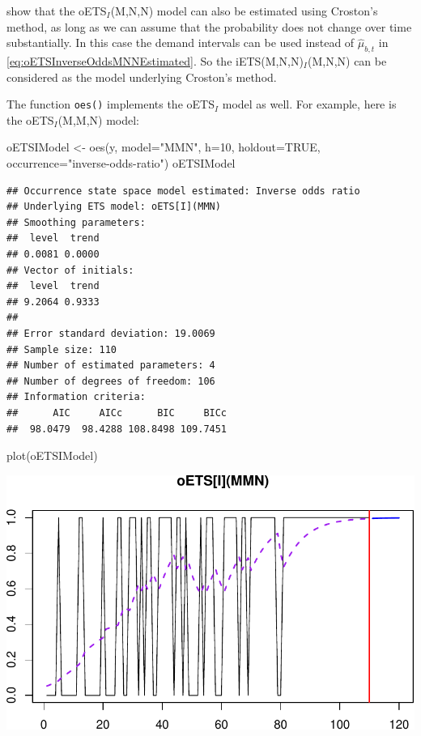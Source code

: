 \documentclass[
]{book}
\newenvironment{Shaded}{\begin{snugshade}}{\end{snugshade}}
\newcommand{\AttributeTok}[1]{\textcolor[rgb]{0.77,0.63,0.00}{#1}}
\newcommand{\ConstantTok}[1]{\textcolor[rgb]{0.00,0.00,0.00}{#1}}
\newcommand{\DecValTok}[1]{\textcolor[rgb]{0.00,0.00,0.81}{#1}}
\newcommand{\FunctionTok}[1]{\textcolor[rgb]{0.00,0.00,0.00}{#1}}
\newcommand{\NormalTok}[1]{#1}
\newcommand{\OtherTok}[1]{\textcolor[rgb]{0.56,0.35,0.01}{#1}}
\newcommand{\StringTok}[1]{\textcolor[rgb]{0.31,0.60,0.02}{#1}}
\theoremstyle{definition}
\theoremstyle{definition}
\theoremstyle{definition}
\theoremstyle{definition}
\theoremstyle{remark}
\begin{document}
\citet{Svetunkov2019a} show that the oETS\(_I\)(M,N,N) model can also be estimated using Croston's method, as long as we can assume that the probability does not change over time substantially. In this case the demand intervals can be used instead of \(\hat{\mu}_{b,t}\) in \eqref{eq:oETSInverseOddsMNNEstimated}. So the iETS(M,N,N)\(_I\)(M,N,N) can be considered as the model underlying Croston's method.

The function \texttt{oes()} implements the oETS\(_I\) model as well. For example, here is the oETS\(_I\)(M,M,N) model:

\begin{Shaded}
\begin{Highlighting}[]
\NormalTok{oETSIModel }\OtherTok{\textless{}{-}} \FunctionTok{oes}\NormalTok{(y, }\AttributeTok{model=}\StringTok{"MMN"}\NormalTok{, }\AttributeTok{h=}\DecValTok{10}\NormalTok{, }\AttributeTok{holdout=}\ConstantTok{TRUE}\NormalTok{,}
                  \AttributeTok{occurrence=}\StringTok{"inverse{-}odds{-}ratio"}\NormalTok{)}
\NormalTok{oETSIModel}
\end{Highlighting}
\end{Shaded}

\begin{verbatim}
## Occurrence state space model estimated: Inverse odds ratio
## Underlying ETS model: oETS[I](MMN)
## Smoothing parameters:
##  level  trend 
## 0.0081 0.0000 
## Vector of initials:
##  level  trend 
## 9.2064 0.9333 
## 
## Error standard deviation: 19.0069
## Sample size: 110
## Number of estimated parameters: 4
## Number of degrees of freedom: 106
## Information criteria: 
##      AIC     AICc      BIC     BICc 
##  98.0479  98.4288 108.8498 109.7451
\end{verbatim}

\begin{Shaded}
\begin{Highlighting}[]
\FunctionTok{plot}\NormalTok{(oETSIModel)}
\end{Highlighting}
\end{Shaded}

\includegraphics{adam_files/figure-latex/oETSIExample1-1.pdf}
\end{document}
